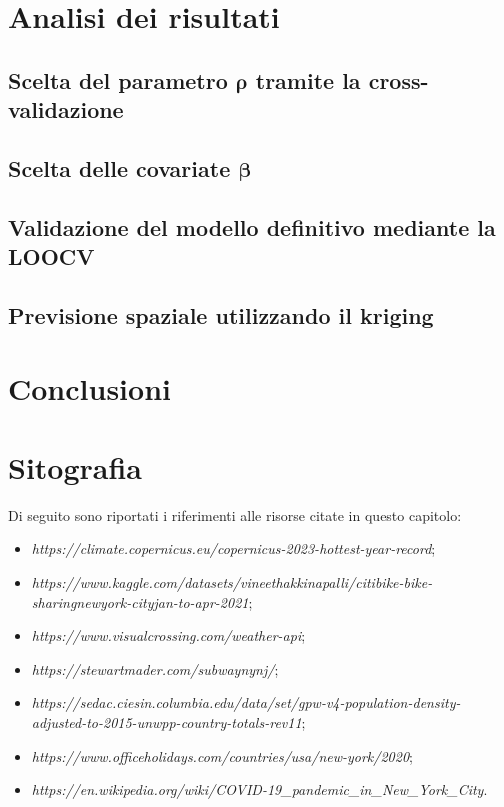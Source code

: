 \section{Analisi dei risultati}
\subsection{Scelta del parametro $\boldsymbol{\rho}$ tramite la cross-validazione}
\subsection{Scelta delle covariate $\boldsymbol{\beta}$}
\subsection{Validazione del modello definitivo mediante la LOOCV}
\subsection{Previsione spaziale utilizzando il kriging}

\section{Conclusioni}

\section{Sitografia}
\label{sitografia_capitolo_4}
Di seguito sono riportati i riferimenti alle risorse citate in questo capitolo:
\begin{itemize}
	\item \textit{https://climate.copernicus.eu/copernicus-2023-hottest-year-record};
	\item \textit{https://www.kaggle.com/datasets/vineethakkinapalli/citibike-bike-sharingnewyork-cityjan-to-apr-2021};
	\item \textit{https://www.visualcrossing.com/weather-api};
	\item \textit{https://stewartmader.com/subwaynynj/};
	\item \textit{https://sedac.ciesin.columbia.edu/data/set/gpw-v4-population-density-adjusted-to-2015-unwpp-country-totals-rev11};
	\item \textit{https://www.officeholidays.com/countries/usa/new-york/2020};
	\item \textit{https://en.wikipedia.org/wiki/COVID-19\_pandemic\_in\_New\_York\_City}.
\end{itemize}

